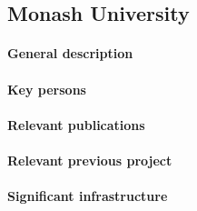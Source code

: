 \subsection{Monash University}
\label{sec:mona}

\paragraph{General description}

\paragraph{Key persons}

\paragraph{Relevant publications}

\paragraph{Relevant previous project}

\paragraph{Significant infrastructure}